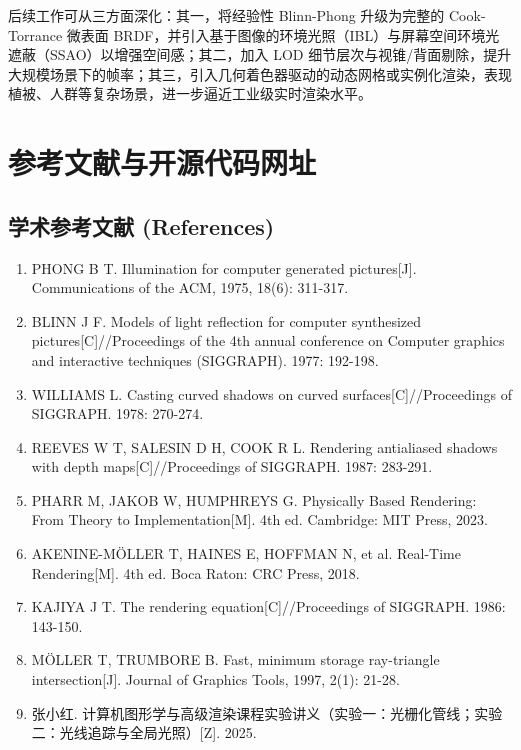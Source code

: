 \documentclass[11pt, a4paper, oneside]{report}
\begin{document}
后续工作可从三方面深化：其一，将经验性 Blinn-Phong 升级为完整的 Cook-Torrance 微表面 BRDF，并引入基于图像的环境光照（IBL）与屏幕空间环境光遮蔽（SSAO）以增强空间感；其二，加入 LOD 细节层次与视锥/背面剔除，提升大规模场景下的帧率；其三，引入几何着色器驱动的动态网格或实例化渲染，表现植被、人群等复杂场景，进一步逼近工业级实时渲染水平。

\chapter{参考文献与开源代码网址}

\section{学术参考文献 (References)}
\begin{enumerate}
    \item[1] PHONG B T. Illumination for computer generated pictures[J]. Communications of the ACM, 1975, 18(6): 311-317.
    \item[2] BLINN J F. Models of light reflection for computer synthesized pictures[C]//Proceedings of the 4th annual conference on Computer graphics and interactive techniques (SIGGRAPH). 1977: 192-198.
    \item[3] WILLIAMS L. Casting curved shadows on curved surfaces[C]//Proceedings of SIGGRAPH. 1978: 270-274.
    \item[4] REEVES W T, SALESIN D H, COOK R L. Rendering antialiased shadows with depth maps[C]//Proceedings of SIGGRAPH. 1987: 283-291.
    \item[5] PHARR M, JAKOB W, HUMPHREYS G. Physically Based Rendering: From Theory to Implementation[M]. 4th ed. Cambridge: MIT Press, 2023.
    \item[6] AKENINE-MÖLLER T, HAINES E, HOFFMAN N, et al. Real-Time Rendering[M]. 4th ed. Boca Raton: CRC Press, 2018.
    \item[7] KAJIYA J T. The rendering equation[C]//Proceedings of SIGGRAPH. 1986: 143-150.
    \item[8] MÖLLER T, TRUMBORE B. Fast, minimum storage ray-triangle intersection[J]. Journal of Graphics Tools, 1997, 2(1): 21-28.
    \item[9] 张小红. 计算机图形学与高级渲染课程实验讲义（实验一：光栅化管线；实验二：光线追踪与全局光照）[Z]. 2025.
\end{enumerate}
\end{document}
